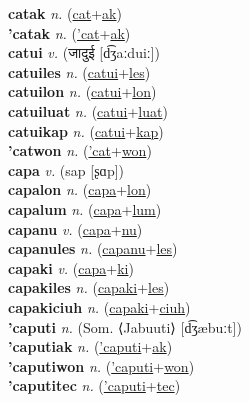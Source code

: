 \textbf{catak} \textit{n.} (\hyperref[cat]{cat}+\hyperref[ak]{ak})
 \label{catak} \\
\textbf{'catak} \textit{n.} (\hyperref['cat]{'cat}+\hyperref[ak]{ak})
 \label{'catak} \\
\textbf{catui} \textit{v.} ({\devanagari{}जादुई} [d͡ʒaːduiː])
 \label{catui} \\
\textbf{catuiles} \textit{n.} (\hyperref[catui]{catui}+\hyperref[les]{les})
 \label{catuiles} \\
\textbf{catuilon} \textit{n.} (\hyperref[catui]{catui}+\hyperref[lon]{lon})
 \label{catuilon} \\
\textbf{catuiluat} \textit{n.} (\hyperref[catui]{catui}+\hyperref[luat]{luat})
 \label{catuiluat} \\
\textbf{catuikap} \textit{n.} (\hyperref[catui]{catui}+\hyperref[kap]{kap})
 \label{catuikap} \\
\textbf{'catwon} \textit{n.} (\hyperref['cat]{'cat}+\hyperref[won]{won})
 \label{'catwon} \\
\textbf{capa} \textit{v.} ({\javanese{}sap} [ʂɑp])
 \label{capa} \\
\textbf{capalon} \textit{n.} (\hyperref[capa]{capa}+\hyperref[lon]{lon})
 \label{capalon} \\
\textbf{capalum} \textit{n.} (\hyperref[capa]{capa}+\hyperref[lum]{lum})
 \label{capalum} \\
\textbf{capanu} \textit{v.} (\hyperref[capa]{capa}+\hyperref[nu]{nu})
 \label{capanu} \\
\textbf{capanules} \textit{n.} (\hyperref[capanu]{capanu}+\hyperref[les]{les})
 \label{capanules} \\
\textbf{capaki} \textit{v.} (\hyperref[capa]{capa}+\hyperref[ki]{ki})
 \label{capaki} \\
\textbf{capakiles} \textit{n.} (\hyperref[capaki]{capaki}+\hyperref[les]{les})
 \label{capakiles} \\
\textbf{capakiciuh} \textit{n.} (\hyperref[capaki]{capaki}+\hyperref[ciuh]{ciuh})
 \label{capakiciuh} \\
\textbf{'caputi} \textit{n.} (Som. ⟨Jabuuti⟩ [d͡ʒæbuːt])
 \label{'caputi} \\
\textbf{'caputiak} \textit{n.} (\hyperref['caputi]{'caputi}+\hyperref[ak]{ak})
 \label{'caputiak} \\
\textbf{'caputiwon} \textit{n.} (\hyperref['caputi]{'caputi}+\hyperref[won]{won})
 \label{'caputiwon} \\
\textbf{'caputitec} \textit{n.} (\hyperref['caputi]{'caputi}+\hyperref[tec]{tec})
